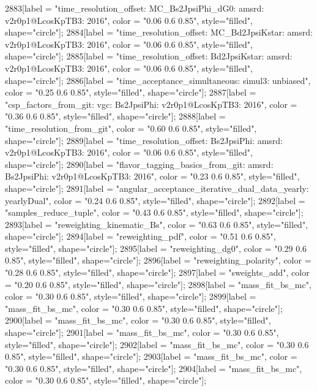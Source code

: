 {	2883[label = "time_resolution_offset\nmode: MC_Bs2JpsiPhi_dG0\ntimeres: amsrd\nversion: v2r0p1@LcosKpTB3\nyear: 2016", color = "0.06 0.6 0.85", style="filled", shape="circle"];
	2884[label = "time_resolution_offset\nmode: MC_Bd2JpsiKstar\ntimeres: amsrd\nversion: v2r0p1@LcosKpTB3\nyear: 2016", color = "0.06 0.6 0.85", style="filled", shape="circle"];
	2885[label = "time_resolution_offset\nmode: Bd2JpsiKstar\ntimeres: amsrd\nversion: v2r0p1@LcosKpTB3\nyear: 2016", color = "0.06 0.6 0.85", style="filled", shape="circle"];
	2886[label = "time_acceptance_simultaneous\ntimeacc: simul3\ntrigger: unbiased", color = "0.25 0.6 0.85", style="filled", shape="circle"];
	2887[label = "csp_factors_from_git\ncsp: vgc\nmode: Bs2JpsiPhi\nversion: v2r0p1@LcosKpTB3\nyear: 2016", color = "0.36 0.6 0.85", style="filled", shape="circle"];
	2888[label = "time_resolution_from_git", color = "0.60 0.6 0.85", style="filled", shape="circle"];
	2889[label = "time_resolution_offset\nmode: Bs2JpsiPhi\ntimeres: amsrd\nversion: v2r0p1@LcosKpTB3\nyear: 2016", color = "0.06 0.6 0.85", style="filled", shape="circle"];
	2890[label = "flavor_tagging_basics_from_git\nflavor: amsrd\nmode: Bs2JpsiPhi\nversion: v2r0p1@LcosKpTB3\nyear: 2016", color = "0.23 0.6 0.85", style="filled", shape="circle"];
	2891[label = "angular_acceptance_iterative_dual_data_yearly\nangacc: yearlyDual", color = "0.24 0.6 0.85", style="filled", shape="circle"];
	2892[label = "samples_reduce_tuple", color = "0.43 0.6 0.85", style="filled", shape="circle"];
	2893[label = "reweighting_kinematic_Bs", color = "0.63 0.6 0.85", style="filled", shape="circle"];
	2894[label = "reweighting_pdf", color = "0.51 0.6 0.85", style="filled", shape="circle"];
	2895[label = "reweighting_dg0", color = "0.29 0.6 0.85", style="filled", shape="circle"];
	2896[label = "reweighting_polarity", color = "0.28 0.6 0.85", style="filled", shape="circle"];
	2897[label = "sweights_add", color = "0.20 0.6 0.85", style="filled", shape="circle"];
	2898[label = "mass_fit_bs_mc", color = "0.30 0.6 0.85", style="filled", shape="circle"];
	2899[label = "mass_fit_bs_mc", color = "0.30 0.6 0.85", style="filled", shape="circle"];
	2900[label = "mass_fit_bs_mc", color = "0.30 0.6 0.85", style="filled", shape="circle"];
	2901[label = "mass_fit_bs_mc", color = "0.30 0.6 0.85", style="filled", shape="circle"];
	2902[label = "mass_fit_bs_mc", color = "0.30 0.6 0.85", style="filled", shape="circle"];
	2903[label = "mass_fit_bs_mc", color = "0.30 0.6 0.85", style="filled", shape="circle"];
	2904[label = "mass_fit_bs_mc", color = "0.30 0.6 0.85", style="filled", shape="circle"];
}
